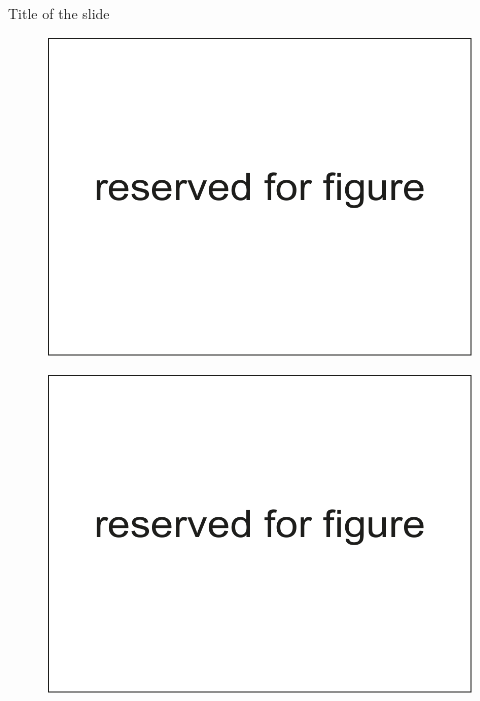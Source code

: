 \documentclass[russian,12pt,aspectratio=169,xcolor=table]{beamer}
\begin{document}
\begin{frame}{Title of the slide}
\begin{minipage}{.49\textwidth}
		\begin{figure}
		\centering
		\includegraphics[width=\textwidth]{img/6}
		\end{figure}
\end{minipage}\hfill 	
\begin{minipage}{.49\textwidth}
		\begin{figure}
		\centering
		\includegraphics[width=\textwidth]{img/6}
	\end{figure}
\end{minipage}
\end{frame}
\end{document}
